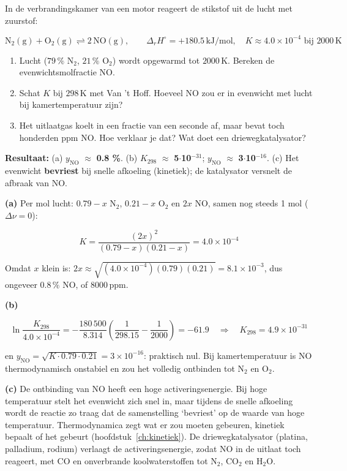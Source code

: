 \begin{oefening}
In de verbrandingskamer van een motor reageert de stikstof uit de lucht met zuurstof:

\[
\mathrm{N_2(g) + O_2(g) \rightleftharpoons 2\,NO(g)}, \qquad \Delta_r H^\circ = +180.5\,\mathrm{kJ/mol}, \quad K \approx 4.0\times10^{-4} \text{ bij } 2000\,\mathrm{K}
\]

\begin{enumerate}
\item[(a)]
  Lucht (\(79\,\%\) \(\mathrm{N_2}\), \(21\,\%\) \(\mathrm{O_2}\)) wordt opgewarmd tot \(2000\,\mathrm{K}\). Bereken de evenwichtsmolfractie NO.
\item[(b)]
  Schat \(K\) bij \(298\,\mathrm{K}\) met Van 't Hoff. Hoeveel NO zou er in evenwicht met lucht bij kamertemperatuur zijn?
\item[(c)]
  Het uitlaatgas koelt in een fractie van een seconde af, maar bevat toch honderden ppm NO. Hoe verklaar je dat? Wat doet een driewegkatalysator?
\end{enumerate}
\end{oefening}
\begin{oplossing}
\textbf{Resultaat:} (a) \(y_{\mathrm{NO}}\) \ensuremath{\approx{}} \textbf{0.8 \%}. (b) \(K_{298}\) \ensuremath{\approx{}} \textbf{5\ensuremath{\cdot{}}10\ensuremath{^{-31}}}; \(y_{\mathrm{NO}}\) \ensuremath{\approx{}} \textbf{3\ensuremath{\cdot{}}10\ensuremath{^{-16}}}. (c) Het evenwicht \textbf{bevriest} bij snelle afkoeling (kinetiek); de katalysator versnelt de afbraak van NO.

\textbf{(a)} Per mol lucht: \(0.79-x\) \(\mathrm{N_2}\), \(0.21-x\) \(\mathrm{O_2}\) en \(2x\) NO, samen nog steeds 1 mol (\(\Delta\nu = 0\)):

\[
K = \frac{(2x)^2}{(0.79-x)(0.21-x)} = 4.0\times10^{-4}
\]

Omdat \(x\) klein is: \(2x \approx \sqrt{(4.0\times10^{-4})(0.79)(0.21)} = 8.1\times10^{-3}\), dus ongeveer \(0.8\,\%\) NO, of \(8000\,\mathrm{ppm}\).

\textbf{(b)}

\[
\ln\frac{K_{298}}{4.0\times10^{-4}} = -\frac{180\,500}{8.314}\left(\frac{1}{298.15} - \frac{1}{2000}\right) = -61.9 \quad\Rightarrow\quad K_{298} = 4.9\times10^{-31}
\]

en \(y_{\mathrm{NO}} = \sqrt{K\cdot 0.79 \cdot 0.21} = 3\times10^{-16}\): praktisch nul. Bij kamertemperatuur is NO thermodynamisch onstabiel en zou het volledig ontbinden tot \(\mathrm{N_2}\) en \(\mathrm{O_2}\).

\textbf{(c)} De ontbinding van NO heeft een hoge activeringsenergie. Bij hoge temperatuur stelt het evenwicht zich snel in, maar tijdens de snelle afkoeling wordt de reactie zo traag dat de samenstelling `bevriest' op de waarde van hoge temperatuur. Thermodynamica zegt wat er zou moeten gebeuren, kinetiek bepaalt of het gebeurt (hoofdstuk~\ref{ch:kinetiek}). De driewegkatalysator (platina, palladium, rodium) verlaagt de activeringsenergie, zodat NO in de uitlaat toch reageert, met CO en onverbrande koolwaterstoffen tot \(\mathrm{N_2}\), \(\mathrm{CO_2}\) en \(\mathrm{H_2O}\).
\end{oplossing}

